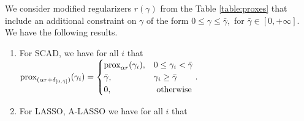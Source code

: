 \begin{theorem}     \label{thm:prox_of_positive_quadrant}
We consider modified regularizers $r(\gamma)$ from the Table \ref{table:proxes} 
that include an additional constraint on $\gamma$ of the form 
\(
0 \leq \gamma \leq \bar\gamma,
\)
for $\bar\gamma\in[0,+\infty]$.
We have the following results. 
    \begin{enumerate}
    \item  For SCAD, we have for all $i$ that \;
\(
    \prox_{(\alpha r + \del_{[0,\bgam]})} %
    (\gamma_{i}) = \begin{cases} 
        \prox_{\alpha r}(\gamma_i), & 0 \leq \gamma_i < \bar\gamma  \\
        \bar\gamma, & \gamma_i \geq \bar\gamma \\
        0, & \text{ otherwise} \end{cases}.
\)
    \item  For LASSO, A-LASSO we have for all $i$ that \;

\end{enumerate}
\end{theorem}
